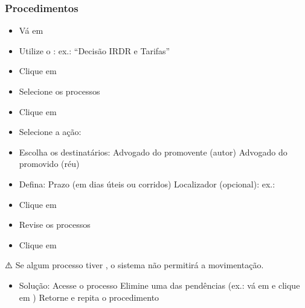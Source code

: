 \documentclass[letterpaper,10pt,brazil]{sphinxmanual}
\begin{document}
\subsubsection{Procedimentos}
\label{\detokenize{projud_08_multiplaeunitariamov:procedimentos}}
\sphinxAtStartPar
{}
\begin{itemize}
\item {} 
\sphinxAtStartPar
Vá em 

\item {} 
\sphinxAtStartPar
Utilize o : ex.: “Decisão IRDR e Tarifas”

\item {} 
\sphinxAtStartPar
Clique em 

\item {} 
\sphinxAtStartPar
Selecione os processos

\item {} 
\sphinxAtStartPar
Clique em 

\end{itemize}

\sphinxAtStartPar
{}
\begin{itemize}
\item {} 
\sphinxAtStartPar
Selecione a ação: 

\item {} 
\sphinxAtStartPar
Escolha os destinatários:
\sphinxhyphen{} Advogado do promovente (autor)
\sphinxhyphen{} Advogado do promovido (réu)

\item {} 
\sphinxAtStartPar
Defina:
\sphinxhyphen{} Prazo (em dias úteis ou corridos)
\sphinxhyphen{} Localizador (opcional): ex.: 

\item {} 
\sphinxAtStartPar
Clique em 

\item {} 
\sphinxAtStartPar
Revise os processos

\item {} 
\sphinxAtStartPar
Clique em 

\end{itemize}

\sphinxAtStartPar
⚠️  Se algum processo tiver , o sistema não permitirá a movimentação.
\begin{itemize}
\item {} 
\sphinxAtStartPar
Solução:
\sphinxhyphen{} Acesse o processo
\sphinxhyphen{} Elimine uma das pendências (ex.: vá em  e clique em )
\sphinxhyphen{} Retorne e repita o procedimento

\end{itemize}
\end{document}
